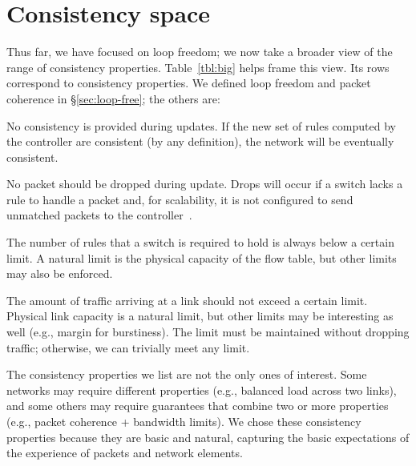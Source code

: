 \section{Consistency space}
\label{sec:table}

Thus far, we have focused on loop freedom; we now take a broader view of the range of consistency properties. Table~\ref{tbl:big} helps frame this view. Its rows correspond to consistency properties. We defined loop freedom and packet coherence in \S\ref{sec:loop-free}; the others are:

 No consistency is provided during updates. If the new set of rules computed by the controller are consistent (by any definition), the network will be eventually consistent.

 No packet should be dropped during update. Drops will occur if a switch lacks a rule to handle a packet and, for scalability, it is not configured to send unmatched packets to the controller~\cite{swan,b4}.



 The number of rules that a switch is required to hold is always below a certain limit. A natural limit is the physical capacity of the flow table, but other limits may also be enforced.

 The amount of traffic arriving at a link should not exceed a certain limit. Physical link capacity is a natural limit, but other limits may be interesting as well (e.g., margin for burstiness). The limit must be maintained without dropping traffic; otherwise, we can trivially meet any limit.

The consistency properties we list are not the only ones of interest.
Some networks may require different properties (e.g., balanced load across two links), and some others may require  guarantees that combine two or more properties (e.g., packet coherence + bandwidth limits). We chose these consistency properties because they are basic and natural, capturing the basic expectations of the experience of packets and network elements.

